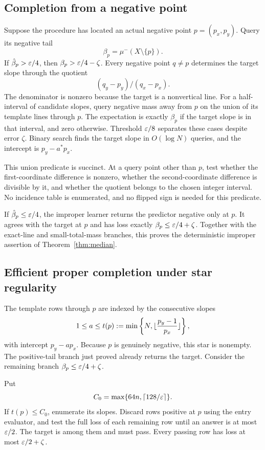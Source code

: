 \subsection{Completion from a negative point}
Suppose the procedure has located an actual negative point $p=(p_x,p_y)$. Query its negative tail
\[
 \beta_p=\mu^-(X\setminus\{p\}).
\]
If $\hat\beta_p>\varepsilon/4$, then $\beta_p>\varepsilon/4-\zeta$. Every negative point $q\ne p$ determines the target slope through the quotient
\[
 (q_y-p_y)/(q_x-p_x).
\]
The denominator is nonzero because the target is a nonvertical line. For a half-interval of candidate slopes, query negative mass away from $p$ on the union of its template lines through $p$. The expectation is exactly $\beta_p$ if the target slope is in that interval, and zero otherwise. Threshold $\varepsilon/8$ separates these cases despite error $\zeta$. Binary search finds the target slope in $O(\log N)$ queries, and the intercept is $p_y-a^*p_x$.

This union predicate is succinct. At a query point other than $p$, test whether the first-coordinate difference is nonzero, whether the second-coordinate difference is divisible by it, and whether the quotient belongs to the chosen integer interval. No incidence table is enumerated, and no flipped sign is needed for this predicate.

If $\hat\beta_p\le\varepsilon/4$, the improper learner returns the predictor negative only at $p$. It agrees with the target at $p$ and has loss exactly $\beta_p\le\varepsilon/4+\zeta$. Together with the exact-line and small-total-mass branches, this proves the deterministic improper assertion of Theorem~\ref{thm:median}.

\subsection{Efficient proper completion under star regularity}
The template rows through $p$ are indexed by the consecutive slopes
\[
 1\le a\le t(p):=\min\left\{N,\lfloor \frac{p_y-1}{p_x}\rfloor\right\},
\]
with intercept $p_y-ap_x$. Because $p$ is genuinely negative, this star is nonempty. The positive-tail branch just proved already returns the target. Consider the remaining branch $\beta_p\le\varepsilon/4+\zeta$.

Put
\[
 C_0=\max\{64n,\lceil 128/\varepsilon\rceil\}.
\]
If $t(p)\le C_0$, enumerate its slopes. Discard rows positive at $p$ using the entry evaluator, and test the full loss of each remaining row until an answer is at most $\varepsilon/2$. The target is among them and must pass. Every passing row has loss at most $\varepsilon/2+\zeta$.

